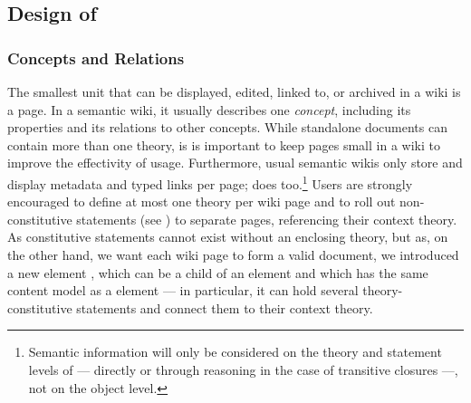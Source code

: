 \subsection{Design of {\swim}}

\subsubsection{Concepts and Relations}

The smallest unit that can be displayed, edited, linked to, or archived in a wiki is a
page. In a semantic wiki, it usually describes one {\emph{concept}}, including its
properties and its relations to other concepts.  While standalone {\omdoc} documents can
contain more than one theory, is is important to keep pages small in a wiki to improve the
effectivity of usage.  Furthermore, usual semantic wikis only store and display metadata
and typed links per page; {\swim} does too.\footnote{Semantic information will only be
  considered on the theory and statement levels of {\omdoc} --- directly or through
  reasoning in the case of transitive closures ---, not on the object level.}  Users are
strongly encouraged to define at most one theory per wiki page and to roll out
non-constitutive statements (see {}) to separate pages,
referencing their context theory.  As constitutive statements cannot exist without an
enclosing theory, but as, on the other hand, we want each wiki page to form a valid
document, we introduced a new element {}, which can be a child
of an {} element and which has the same content model as a
{} element --- in particular, it can hold several theory-constitutive
statements and connect them to their context theory.
